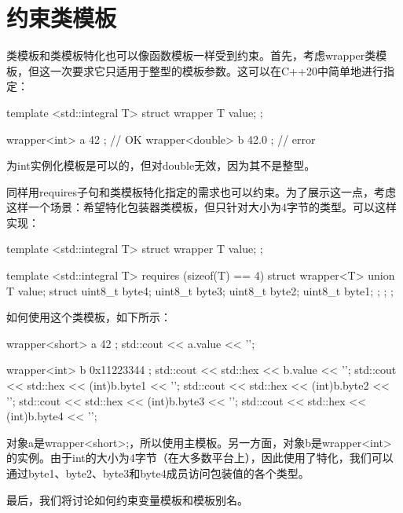 \section{约束类模板}
类模板和类模板特化也可以像函数模板一样受到约束。首先，考虑wrapper类模板，但这一次要求它只适用于整型的模板参数。这可以在C++20中简单地进行指定：

\begin{cppcode}
template <std::integral T>
struct wrapper
{
	T value;
};

wrapper<int> a{ 42 }; // OK
wrapper<double> b{ 42.0 }; // error
\end{cppcode}

为int实例化模板是可以的，但对double无效，因为其不是整型。

同样用requires子句和类模板特化指定的需求也可以约束。为了展示这一点，考虑这样一个场景：希望特化包装器类模板，但只针对大小为4字节的类型。可以这样实现：

\begin{cppcode}
template <std::integral T>
struct wrapper
{
	T value;
};

template <std::integral T>
requires (sizeof(T) == 4)
struct wrapper<T>
{
	union
	{
		T value;
		struct
		{
			uint8_t byte4;
			uint8_t byte3;
			uint8_t byte2;
			uint8_t byte1;
		};
	};
};
\end{cppcode}

如何使用这个类模板，如下所示：

\begin{cppcode}
wrapper<short> a{ 42 };
std::cout << a.value << '\n';

wrapper<int> b{ 0x11223344 };
std::cout << std::hex << b.value << '\n';
std::cout << std::hex << (int)b.byte1 << '\n';
std::cout << std::hex << (int)b.byte2 << '\n';
std::cout << std::hex << (int)b.byte3 << '\n';
std::cout << std::hex << (int)b.byte4 << '\n';
\end{cppcode}

对象a是wrapper<short>;，所以使用主模板。另一方面，对象b是wrapper<int>的实例。由于int的大小为4字节（在大多数平台上），因此使用了特化，我们可以通过byte1、byte2、byte3和byte4成员访问包装值的各个类型。

最后，我们将讨论如何约束变量模板和模板别名。




































































